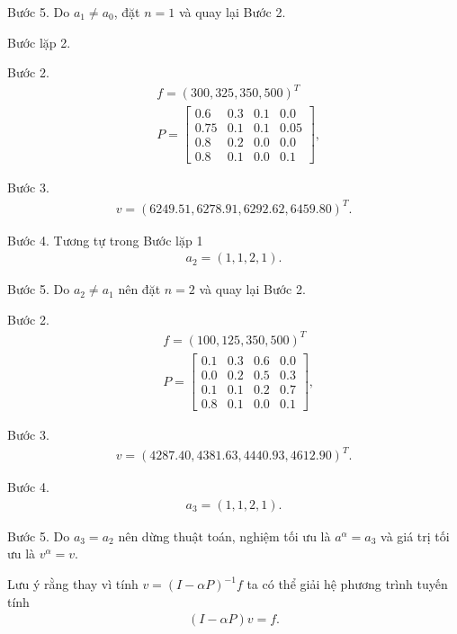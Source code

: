 \documentclass[12pt,a4paper]{report}
\begin{document}
  \medskip
  \noindent
  Bước 5. Do $a_1 \neq a_0$, đặt $n=1$ và quay lại Bước 2.
  
  \medskip
  \noindent
  Bước lặp 2.
  
   \noindent
  Bước 2. 
  \begin{align*}
 &f=(300, 325, 350, 500)^T\\
 &P=\left[
 \begin{array}{cccc}
 0.6&0.3&0.1&0.0\\
 0.75&0.1&0.1&0.05\\
 0.8&0.2&0.0&0.0\\
 0.8&0.1&0.0&0.1
 \end{array}
 \right], 
 \end{align*}
 
 \medskip
 \noindent  
 Bước 3. 
 \begin{align*}
 v=(6249.51,6278.91, 6292.62, 6459.80)^T.
 \end{align*}
 
 \medskip
 \noindent
 Bước 4. Tương tự trong Bước lặp 1
 \begin{align*}
 a_2=(1,1,2,1).
 \end{align*} 
 
 \medskip
 \noindent
 Bước 5. Do $a_2 \neq a_1$ nên đặt $n=2$ và quay lại Bước 2.
 
 \medskip
 \noindent
 Bước 2. 
  \begin{align*}
&f=(100, 125, 350, 500)^T\\
&P=\left[
\begin{array}{cccc}
0.1&0.3&0.6&0.0\\
0.0&0.2&0.5&0.3\\
0.1&0.1&0.2&0.7\\
0.8&0.1&0.0&0.1
\end{array}
\right], 
\end{align*}

\medskip
\noindent
Bước 3. 
\begin{align*}
   v=(4287.40, 4381.63, 4440.93,4612.90)^T.
   \end{align*}
  
  \medskip
  \noindent
  Bước 4.
  \begin{align*}
  a_3=(1,1,2,1).
  \end{align*}
 
 \medskip
 \noindent
 Bước 5. Do $a_3 = a_2$ nên dừng thuật toán, nghiệm tối ưu là $a^\alpha =a_3$ và giá trị tối ưu là $v^\alpha =v$.
 
 \medskip
 Lưu ý rằng thay vì tính $v=(I-\alpha P)^{-1}f$ ta có thể giải hệ phương trình tuyến tính
 \begin{align*}
 (I-\alpha P)v=f.
 \end{align*}
 
\end{document}
